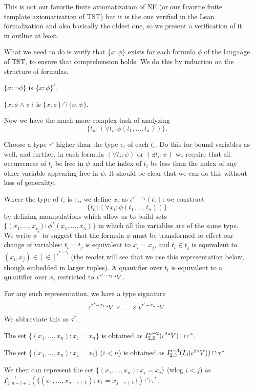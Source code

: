 \documentclass[112pt]{article}
\theoremstyle{definition}
\theoremstyle{remark}
\begin{document}
This is not our favorite finite axiomatization of NF (or our favorite finite template axiomatization of TST) but it is the one verified in the Lean formalization and also basically the oldest one, so we present a verification of it in outline at least.

What we need to do is verify that $\{x:\phi\}$ exists for each formula $\phi$ of the language of TST, to ensure that comprehension holds.  We do this by induction on the structure of formulas.

$\{x:\neg \phi\}$ is $\{x :\phi\}^c$.

$\{x :\phi \wedge \psi\}$ is $\{x:\phi \} \cap \{x:\psi\}$.

Now we have the much more complex task of analyzing $$\{t_{n}:(\forall t_i:\phi(t_1,\ldots,t_n))\}.$$

Choose a type $\tau'$ higher than the type $\tau_i$ of each $t_i$.  Do this for bound variables
as well, and further, in each formula $(\forall t_i:\psi)$ or $(\exists t_i:\psi)$ we require that all occurrences of $t_i$ be free in $\psi$ and the index of $t_i$ be less than the index
of any other variable appearing free in $\psi$.  It should be clear that we can do this without loss of generality.

Where the type of $t_i$ is $\tau_i$, we define $x_i$ as $\iota^{\tau'-\tau_i}(t_i)$:  we construct $$\{t_{n}:(\forall x_i:\phi(t_1,\ldots,t_n))\}$$ by defining manipulations which allow us to build sets $\{(x_1,\ldots,x_n):\phi^*(x_1,\ldots,x_n)\}$ in which
all the variables are of the same type.  We write $\phi^*$ to suggest that the formula $\phi$ must be transformed to effect our change of variables:  $t_i = t_j$ is equivalent to $x_i = x_j$, and $t_i \in t_j$ is equivalent to $(x_i,x_j) \in [\in]^{\iota^{\tau'-\tau_j}}$  (the reader will see that we use this representation below, though embedded in larger tuples).  A quantifier over $t_i$ is equivalent to a quantifier over $x_i$ restricted to $\iota^{\tau'-\tau_i}``V$.

For any such representation, we have a type signature $$\iota^{\tau'-\tau_1}``V \times \ldots \times \iota^{\tau'-\tau_n}``V.$$  We abbreviate this as $\tau^*$.

The set $\{(x_1,\ldots,x_n):x_1 = x_n\}$ is obtained as $I_{2,2}^{n-2}(\iota^2``V)\cap \tau^*$.

The set $\{(x_1,\dots,x_n):x_1 = x_i\}$ ($i<n$) is obtained as $I_{2,3}^{i-3}(I_3(\iota^2``V))\cap \tau^*$.

We then can represent the
set $\{(x_1,\ldots,x_n):x_i = x_j\}$ (wlog $i<j$) as \newline $I_{1,n-i+1}^{i-1}(\{(x_1,\ldots,x_{n-i+1}):x_1 = x_{j-i+1}\})\cap \tau^*$.
\end{document}

